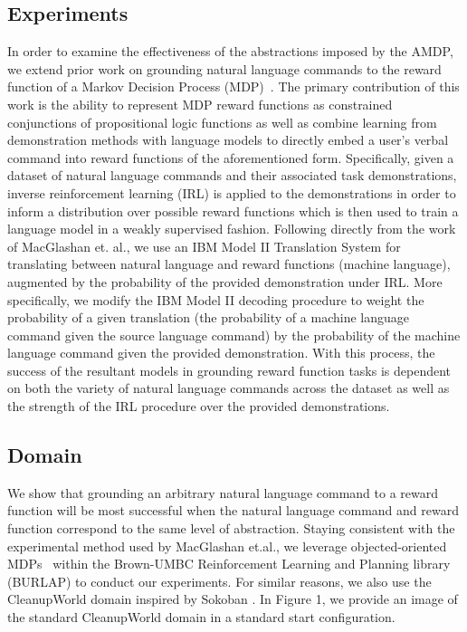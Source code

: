 \documentclass[conference]{IEEEtran}
\begin{document}
\subsection{Experiments}

In order to examine the effectiveness of the abstractions imposed by the AMDP, we extend prior work on grounding natural language commands to the reward function of a Markov Decision Process (MDP)~\cite{MacGlashan2015GroundingEC}. The primary contribution of this work is the ability to represent MDP reward functions as constrained conjunctions of propositional logic functions as well as combine learning from demonstration methods with language models to directly embed a user's verbal command into reward functions of the aforementioned form. Specifically, given a dataset of natural language commands and their associated task demonstrations, inverse reinforcement learning (IRL) is applied to the demonstrations in order to inform a distribution over possible reward functions which is then used to train a language model in a weakly supervised fashion. Following directly from the work of MacGlashan et. al., we use an IBM Model II Translation System for translating between natural language and reward functions (machine language), augmented by the probability of the provided demonstration under IRL. More specifically, we modify the IBM Model II decoding procedure to weight the probability of a given translation (the probability of a machine language command given the source language command) by the probability of the machine language command given the provided demonstration. With this process, the success of the resultant models in grounding reward function tasks is dependent on both the variety of natural language commands across the dataset as well as the strength of the IRL procedure over the provided demonstrations.

\subsection{Domain}

We show that grounding an arbitrary natural language command to a reward function will be most successful when the natural language command and reward function correspond to the same level of abstraction. Staying consistent with the experimental method used by MacGlashan et.al., we leverage objected-oriented MDPs~\cite{Diuk2008AnOR} within the Brown-UMBC Reinforcement Learning and Planning library (BURLAP) to conduct our experiments. For similar reasons, we also use the CleanupWorld domain inspired by Sokoban \cite{Junghanns2001SokobanEG}. In Figure 1, we provide an image of the standard CleanupWorld domain in a standard start configuration.
\end{document}
